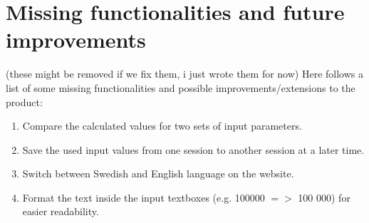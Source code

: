 \documentclass[]{article}
\begin{document}
\section{Missing functionalities and future improvements}
(these might be removed if we fix them, i just wrote them for now)
Here follows a list of some missing functionalities and possible improvements/extensions to the product:
\begin{enumerate}
	\item Compare the calculated values for two sets of input parameters.
	\item Save the used input values from one session to another session at a later time.
	\item Switch between Swedish and English language on the website.
	\item Format the text inside the input textboxes (e.g. 100000 $=>$ 100 000) for easier readability. 
\end{enumerate}
\end{document}
